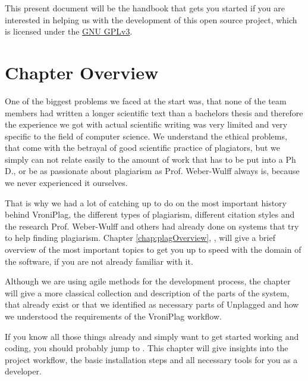 This present document will be the handbook that gets you started if you are interested in helping us with the development of this 
open source project, which is licensed under the \href{http://www.gnu.org/licenses/quick-guide-gplv3}{GNU GPLv3}.

\section{Chapter Overview}

One of the biggest problems we faced at the start was, that none of the team members had written a longer scientific
text than a bachelors
thesis and therefore the experience we got with actual scientific writing was very limited and very specific to the 
field of computer science. We understand the ethical problems, that come with the betrayal of 
good scientific practice of plagiators, but we simply can not relate easily to the amount of work that has to be put into 
a Ph D., or be as 
passionate about plagiarism as Prof. Weber-Wulff always is, because we never experienced it ourselves.

That is why we had a lot of catching up to do on the most important history behind VroniPlag, the different types
of plagiarism, different citation styles and the research Prof. Weber-Wulff and others had already done on systems that try to 
help finding plagiarism. Chapter \ref{chap:plagOverview}, , will
give a brief overview of the most important topics to get you up to speed with the domain of the software, if you are
not already familiar with it.

Although we are using agile methods for the development process, the chapter  will give
a more classical collection and description of the parts of the system, that already exist or that we identified as 
necessary parts of Unplagged and how we understood the requirements of the 
VroniPlag workflow.

If you know all those things already and simply want to get started working and coding, you should probably jump
to . This chapter will give insights into the project workflow, the basic installation
steps and all necessary tools for you as a developer.